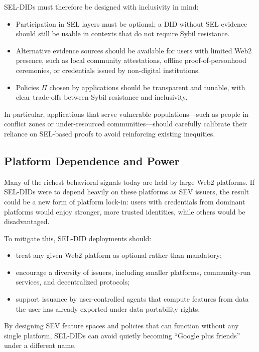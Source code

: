 \documentclass[11pt]{article}
\begin{document}
SEL-DIDs must therefore be designed with inclusivity in mind:

\begin{itemize}
  \item Participation in SEL layers must be optional; a DID without SEL evidence should still be usable in contexts that do not require Sybil resistance.
  \item Alternative evidence sources should be available for users with limited Web2 presence, such as local community attestations, offline proof-of-personhood ceremonies, or credentials issued by non-digital institutions.
  \item Policies $\Pi$ chosen by applications should be transparent and tunable, with clear trade-offs between Sybil resistance and inclusivity.
\end{itemize}

In particular, applications that serve vulnerable populations---such as people in conflict zones or under-resourced communities---should carefully calibrate their reliance on SEL-based proofs to avoid reinforcing existing inequities.

\subsection{Platform Dependence and Power}

Many of the richest behavioral signals today are held by large Web2 platforms. If SEL-DIDs were to depend heavily on these platforms as SEV issuers, the result could be a new form of platform lock-in: users with credentials from dominant platforms would enjoy stronger, more trusted identities, while others would be disadvantaged.

To mitigate this, SEL-DID deployments should:

\begin{itemize}
  \item treat any given Web2 platform as optional rather than mandatory;
  \item encourage a diversity of issuers, including smaller platforms, community-run services, and decentralized protocols;
  \item support issuance by user-controlled agents that compute features from data the user has already exported under data portability rights.
\end{itemize}

By designing SEV feature spaces and policies that can function without any single platform, SEL-DIDs can avoid quietly becoming ``Google plus friends'' under a different name.
\end{document}
